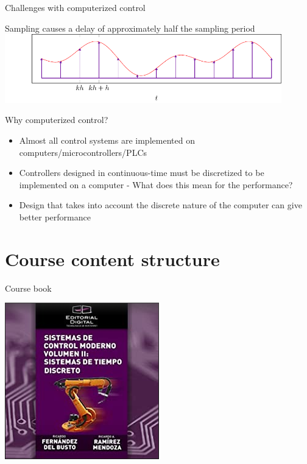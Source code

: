 \documentclass[presentation,aspectratio=169]{beamer}
\begin{document}
\begin{frame}[label={sec:org66cb20f}]{Challenges with computerized control}
\begin{block}{Sampling causes a delay of approximately half the sampling period}
\includegraphics[width=0.9\textwidth]{../../figures/modulation-model-timeseries}
\end{block}
\end{frame}


\begin{frame}[label={sec:orgf3ad391}]{Why computerized control?}
\begin{itemize}
\item Almost all control systems are implemented on computers/microcontrollers/PLCs
\item Controllers designed in continuous-time must be discretized to be implemented on a computer - What does this mean for the performance?
\item Design that takes into account the discrete nature of the computer can give better performance
\end{itemize}
\end{frame}

\section{Course content structure}
\label{sec:org754a567}

\begin{frame}[label={sec:org1e8c60c}]{Course book}
\begin{center}
\includegraphics[width=0.4\linewidth]{../../figures/tec-book.png}
\end{center}
\end{frame}
\end{document}
